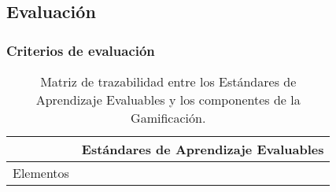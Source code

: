 \subsection{Evaluación}

\subsubsection{Criterios de evaluación}


\begin{table}[hbtp]
\caption{Matriz de trazabilidad entre los Estándares de Aprendizaje Evaluables y los componentes de la Gamificación.}
\label{Trazabilidad}
\begin{tabular}{c|c}
& Estándares de Aprendizaje Evaluables\\\hline
Elementos & \\\hline
\end{tabular}
\end{table}












